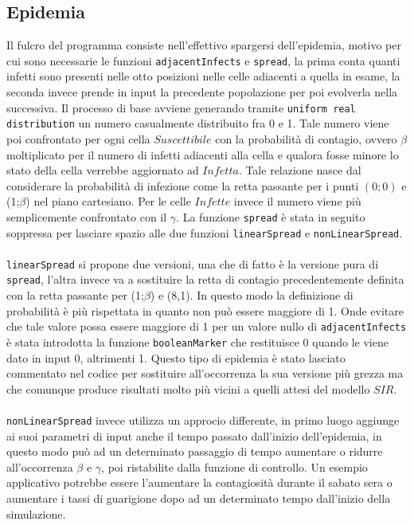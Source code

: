 \documentclass[a4paper]{article}
\begin{document}
\subsection{Epidemia}
Il fulcro del programma consiste nell'effettivo spargersi dell'epidemia, motivo per cui sono necessarie le funzioni \texttt{adjacentInfects} e \texttt{spread}, la prima conta quanti infetti sono presenti nelle otto posizioni nelle celle adiacenti a quella in esame, la seconda invece prende in input la precedente popolazione per poi evolverla nella successiva. Il processo di base avviene generando tramite \texttt{uniform real distribution} un numero casualmente distribuito fra 0 e 1. Tale numero viene poi confrontato per ogni cella $Suscettibile$ con la probabilità di contagio, ovvero $\beta$ moltiplicato per il numero di infetti adiacenti alla cella e qualora fosse minore lo stato della cella verrebbe aggiornato ad $Infetta$. Tale relazione nasce dal considerare la probabilità di infezione come la retta passante per i punti $(0;0)$ e (1;$\beta$) nel piano cartesiano. Per le celle $Infette$ invece il numero viene più semplicemente confrontato con il $\gamma$. La funzione \texttt{spread} è stata in seguito soppressa per lasciare spazio alle due funzioni \texttt{linearSpread} e \texttt{nonLinearSpread}.\\ \\ \texttt{linearSpread} si propone due versioni, una che di fatto è la versione pura di \texttt{spread}, l'altra invece va a sostituire la retta di contagio precedentemente definita con la retta passante per (1;$\beta$) e (8,1). In questo modo la definizione di probabilità è più rispettata in quanto non può essere maggiore di 1. Onde evitare che tale valore possa essere maggiore di 1 per un valore nullo di \texttt{adjacentInfects} è stata introdotta la funzione \texttt{booleanMarker} che restituisce 0 quando le viene dato in input 0, altrimenti 1. Questo tipo di epidemia è stato lasciato commentato nel codice per sostituire all'occorrenza la sua versione più grezza ma che comunque produce risultati molto più vicini a quelli attesi del modello $SIR$.\\ \\
\texttt{nonLinearSpread} invece utilizza un approcio differente, in primo luogo aggiunge ai suoi parametri di input anche il tempo passato dall'inizio dell'epidemia, in questo modo può ad un determinato passaggio di tempo aumentare o ridurre all'occorrenza $\beta$ e $\gamma$, poi ristabilite dalla funzione di controllo. Un esempio applicativo potrebbe essere l'aumentare la contagiosità durante il sabato sera o aumentare i tassi di guarigione dopo ad un determinato tempo dall'inizio della simulazione. \\
\end{document}
